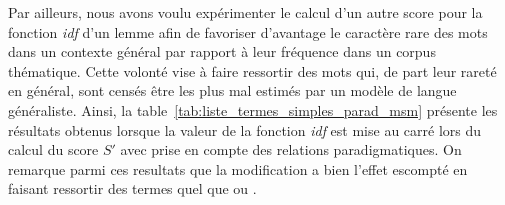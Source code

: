Par ailleurs, nous avons voulu expérimenter le calcul d'un autre score pour la
fonction \textit{idf} d'un lemme afin de favoriser d'avantage le caractère rare
des mots dans un contexte général par rapport à leur fréquence dans un corpus
thématique. Cette volonté vise à faire ressortir des mots qui, de part leur
rareté en général, sont censés être les plus mal estimés par un modèle de
langue généraliste.
Ainsi, la table~\ref{tab:liste_termes_simples_parad_msm} présente les résultats
obtenus lorsque la valeur de la fonction \textit{idf} est mise au carré lors du
calcul du score $S'$ avec prise en compte des relations paradigmatiques. On
remarque parmi ces resultats que la modification a bien l'effet escompté en
faisant ressortir des termes quel que  ou .



